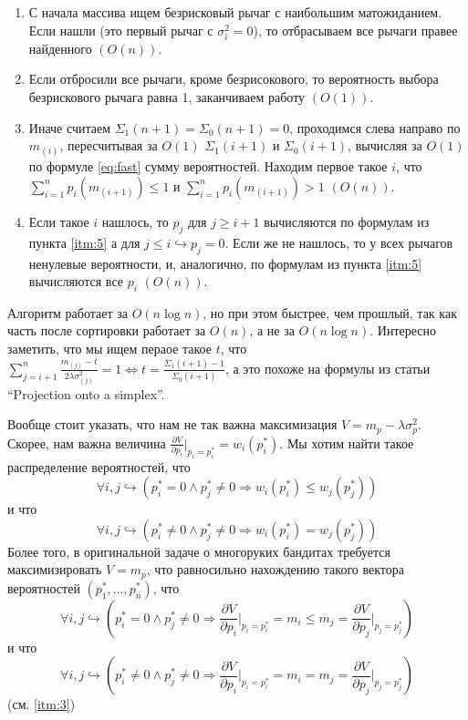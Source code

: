 \documentclass{article}
\begin{document}
\begin{enumerate}
\begin{enumerate}
        \item С начала массива ищем безрисковый рычаг с наибольшим матожиданием. Если нашли (это первый рычаг с $\sigma_i^2 = 0$), то отбрасываем все рычаги правее найденного $\left(O(n) \right)$. 
        \item Если отбросили все рычаги, кроме безрисокового, то вероятность выбора безрискового рычага равна 1, заканчиваем работу $\left( O(1) \right)$.
        \item Иначе считаем $\Sigma_1(n+1) = \Sigma_0(n+1) = 0$, проходимся слева направо по $m_{(i)}$, пересчитывая за $O(1)$ $\Sigma_1(i+1)$ и $\Sigma_0(i+1)$, вычисляя за $O(1)$ по формуле \ref{eq:fast} сумму вероятностей. Находим первое такое $i$, что $\sum_{i=1}^n p_i(m_{(i+1)}) \leq 1$ и $\sum_{i=1}^n p_i(m_{(i+1)}) > 1$ $\left( O(n) \right)$.
        \item Если такое $i$ нашлось, то $p_j$ для $j \geq i + 1$ вычисляются по формулам из пункта \ref{itm:5} а для $j \leq i \hookrightarrow p_j = 0$. Если же не нашлось, то у всех рычагов ненулевые вероятности, и, аналогично, по формулам из пункта \ref{itm:5} вычисляются все $p_i$ $\left( O(n) \right)$.
    \end{enumerate}

    Алгоритм работает за $O(n \log n)$, но при этом быстрее, чем прошлый, так как часть после сортировки работает за $O(n)$, а не за $O(n \log n)$. Интересно заметить, что мы ищем пераое такое $t$, что $\sum_{j=i+1}^n \frac{m_{(j)} - t}{2\lambda \sigma_{(j)}^2} = 1 \Leftrightarrow t = \frac{\Sigma_1(i+1) - 1}{\Sigma_0(i+1)}$, а это похоже на формулы из статьи ``Projection onto a simplex''.
\end{enumerate}

Вообще стоит указать, что нам не так важна максимизация $V = m_p - \lambda \sigma_p^2$. Скорее, нам важна величина $\frac{\partial V}{\partial p_i}\Bigg|_{p_i = p_i^*} = w_i(p_i^*)$. Мы хотим найти такое распределение вероятностей, что 
\[
    \forall i,j \hookrightarrow (p_i^* = 0 \land p_j^* \neq 0 \Rightarrow w_i(p_i^*) \leq w_j(p_j^*))
\]
и что 
\[
    \forall i,j \hookrightarrow (p_i^* \neq 0 \land p_j^* \neq 0 \Rightarrow w_i(p_i^*) = w_j(p_j^*))
\]
Более того, в оригинальной задаче о многоруких бандитах требуется максимизировать $V = m_p$, что равносильно нахождению такого вектора вероятностей $(p_1^*, ..., p_n^*)$, что 
\[
    \forall i,j \hookrightarrow \left(p_i^* = 0 \land p_j^* \neq 0 \Rightarrow \frac{\partial V}{\partial p_i}\Bigg|_{p_i = p_i^*} = m_i \leq m_j = \frac{\partial V}{\partial p_j}\Bigg|_{p_j = p_j^*} \right)
\]
и что 
\[
    \forall i,j \hookrightarrow \left(p_i^* \neq 0 \land p_j^* \neq 0 \Rightarrow \frac{\partial V}{\partial p_i}\Bigg|_{p_i = p_i^*} = m_i = m_j = \frac{\partial V}{\partial p_j}\Bigg|_{p_j = p_j^*} \right)
\]
(см. \ref{itm:3})
\end{document}
